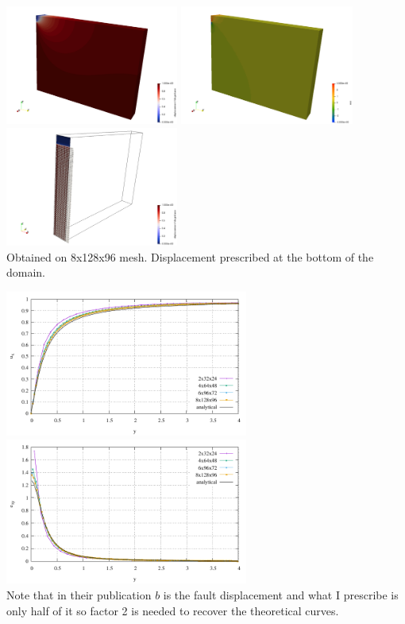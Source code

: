 \begin{center}
\includegraphics[width=5.7cm]{python_codes/fieldstone_123/results/exp3/disp}
\includegraphics[width=5.7cm]{python_codes/fieldstone_123/results/exp3/exy}
\includegraphics[width=5.7cm]{python_codes/fieldstone_123/results/exp3/slice}\\
{\captionfont Obtained on 8x128x96 mesh. Displacement prescribed at the bottom of the domain.}
\end{center}


\begin{center}
\includegraphics[width=8cm]{python_codes/fieldstone_123/results/exp3/xprofile.pdf}
\includegraphics[width=8cm]{python_codes/fieldstone_123/results/exp3/topfile.pdf}\\
{\captionfont Note that in their publication $b$ is the fault displacement 
and what I prescribe is only half of it so factor 2 is needed to recover the theoretical curves.}
\end{center}


